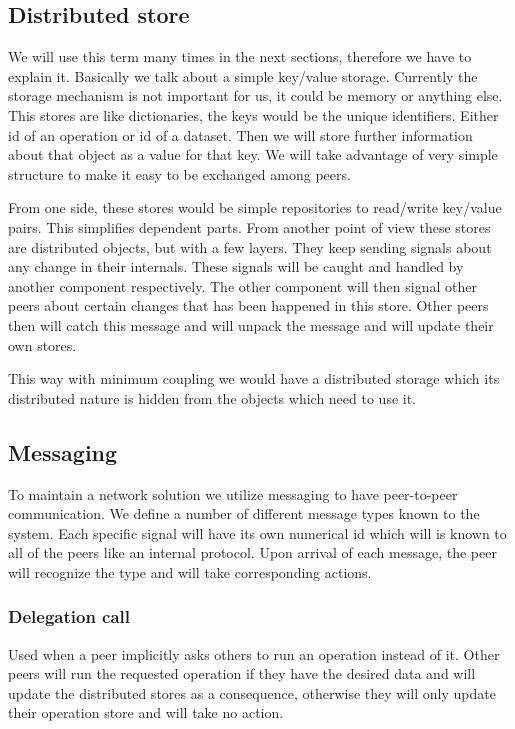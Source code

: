 \subsection{Distributed store}
We will use this term many times in the next sections, therefore we have to explain it.
Basically we talk about a simple key/value storage. 
Currently the storage mechanism is not important for us, it could be memory or anything else.
This stores are like dictionaries, the keys would be the unique identifiers.
Either id of an operation or id of a dataset. 
Then we will store further information about that object as a value for that key.
We will take advantage of very simple structure to make it easy to be exchanged among peers.

From one side, these stores would be simple repositories to read/write key/value pairs.
This simplifies dependent parts.
From another point of view these stores are distributed objects, but with a few layers.
They keep sending signals about any change in their internals.
These signals will be caught and handled by another component respectively.
The other component will then signal other peers about certain changes that has been happened in this store.
Other peers then will catch this message and will unpack the message and will update their own stores.

This way with minimum coupling we would have a distributed storage which its distributed nature is hidden from
the objects which need to use it.

\subsection{Messaging}
To maintain a network solution we utilize messaging to have peer-to-peer communication. 
We define a number of different message types known to the system. 
Each specific signal will have its own numerical id which will is known to all of the peers like an internal protocol.
Upon arrival of each message, the peer will recognize the type and will take corresponding actions.

\subsubsection{Delegation call}
Used when a peer implicitly asks others to run an operation instead of it.
Other peers will run the requested operation if they have the desired data and will update
the distributed stores as a consequence, otherwise they will only update their operation store and will take no action.

